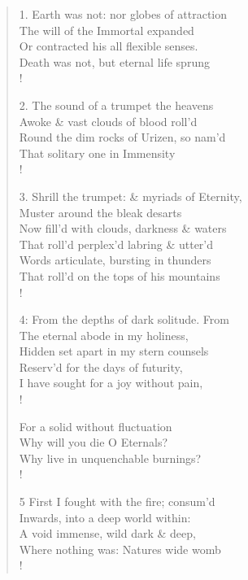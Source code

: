 \documentclass[9pt]{extarticle}
\begin{document}
\begin{verse}
\begin{altverse}
\end{altverse}
\end{verse}	

\begin{verse}
\begin{altverse} 
		
		1. Earth was not: nor globes of attraction\\
		The will of the Immortal expanded\\
		Or contracted his all flexible senses.\\
		Death was not, but eternal life sprung\\!
		
		2. The sound of a trumpet the heavens\\
		Awoke \& vast clouds of blood roll'd\\
		Round the dim rocks of Urizen, so nam'd\\
		That solitary one in Immensity\\!
		
		3. Shrill the trumpet: \& myriads of Eternity,\\
		Muster around the bleak desarts\\
		Now fill'd with clouds, darkness \& waters\\
		That roll'd perplex'd labring \& utter'd\\
		Words articulate, bursting in thunders\\
		That roll'd on the tops of his mountains\\!
		
		4: From the depths of dark solitude. From\\
		The eternal abode in my holiness,\\
		Hidden set apart in my stern counsels\\
		Reserv'd for the days of futurity,\\
		I have sought for a joy without pain,\\!
		
		For a solid without fluctuation\\
		Why will you die O Eternals?\\
		Why live in unquenchable burnings?\\!
		
		5 First I fought with the fire; consum'd\\
		Inwards, into a deep world within:\\
		A void immense, wild dark \& deep,\\
		Where nothing was: Natures wide womb\\!
		

\end{altverse}
\end{verse}
\end{document}
